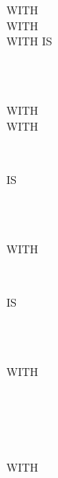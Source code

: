 \begin{1=}
{\begin{0-1}
      WITH  \\

      WITH  \\

      WITH  IS
      \begin{1=}
        \identifier \\
        \literal
      \end{1=} \\

      WITH  \\

      WITH
      \begin{1=}
         \\
      \end{1=}
      IS
      \begin{1=}
        \identifier \\
        \integer
      \end{1=} \\

      WITH
      \begin{1=}
         \\
      \end{1=}
      IS
      \begin{1=}
        \identifier \\
        \integer
      \end{1=} \\

      WITH  
      \begin{0-1}
        \identifier \\
        \integer
      \end{0-1}
      \begin{1=}
         \\
      \end{1=} \\

      WITH  
      \begin{0-1}
        \identifier \\
        \integer
      \end{0-1}
      \begin{1=}
         \\
      \end{1=} \\
    \end{0-1}
  }
\end{1=} \miscext{\ldots}

